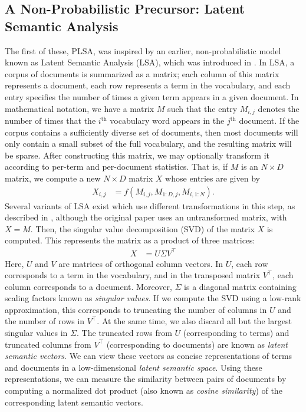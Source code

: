 \documentclass{article}
\newcommand{\nth}{^{\text{th}}}
\begin{document}
\subsection{A Non-Probabilistic Precursor: Latent Semantic Analysis}

The first of these, PLSA, was inspired by an earlier, non-probabilistic model known as Latent Semantic Analysis (LSA), which was introduced in \cite{deerwester1990lsa}.
In LSA, a corpus of documents is summarized as a matrix; each column of this matrix represents a document, each row represents a term in the vocabulary, and each entry specifies the number of times a given term appears in a given document.
In mathematical notation, we have a matrix $M$ such that the entry $M_{i,j}$ denotes the number of times that the $i\nth$ vocabulary word appears in the $j\nth$ document.
If the corpus contains a sufficiently diverse set of documents, then most documents will only contain a small subset of the full vocabulary, and the resulting matrix will be sparse.
After constructing this matrix, we may optionally transform it according to per-term and per-document statistics.
That is, if $M$ is an $N \times D$ matrix, we compute a new $N \times D$ matrix $X$ whose entries are given by
\begin{align}
X_{i,j} &= f(M_{i,j}, M_{1:D,j}, M_{i,1:N}).
\end{align}
Several variants of LSA exist which use different transformations in this step, as described in \cite{wiki:lsa}, although the original paper \cite{deerwester1990lsa} uses an untransformed matrix, with $X = M$.
Then, the singular value decomposition (SVD) of the matrix $X$ is computed.
This represents the matrix as a product of three matrices:
\begin{align}
X &= U \Sigma V^\top
\end{align}
Here, $U$ and $V$ are matrices of orthogonal column vectors.
In $U$, each row corresponds to a term in the vocabulary, and in the transposed matrix $V^\top$, each column corresponds to a document.
Moreover, $\Sigma$ is a diagonal matrix containing scaling factors known as \emph{singular values}.
If we compute the SVD using a low-rank approximation, this corresponds to truncating the number of columns in $U$ and the number of rows in $V^\top$.
At the same time, we also discard all but the largest singular values in $\Sigma$.
The truncated rows from $U$ (corresponding to terms) and truncated columns from $V^\top$ (corresponding to documents) are known as \emph{latent semantic vectors}.
We can view these vectors as concise representations of terms and documents in a low-dimensional \emph{latent semantic space}.
Using these representations, we can measure the similarity between pairs of documents by computing a normalized dot product (also known as \emph{cosine similarity}) of the corresponding latent semantic vectors.
\end{document}
